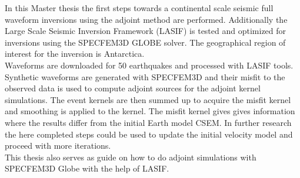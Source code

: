 
In this Master thesis the first steps towards a continental scale seismic full waveform inversions 
using the adjoint method are performed. 
Additionally the Large Scale Seismic Inversion Framework 
(LASIF) is tested and optimized for inversions using the SPECFEM3D GLOBE solver.
The geographical region of interest for the inversion is Antarctica. \\
% 
Waveforms are downloaded for 50 earthquakes and processed with LASIF tools. 
Synthetic waveforms are generated with SPECFEM3D and their misfit to the observed data is used
to compute adjoint sources for the adjoint kernel simulations. 
The event kernels are then summed up to acquire the misfit kernel and smoothing is applied to the kernel.
The misfit kernel gives gives information where the results differ from the initial Earth model CSEM.
In further research the here completed steps could be used to update the initial velocity model and 
proceed with more iterations.\\
This thesis also serves as guide on how to do adjoint simulations with SPECFEM3D Globe with the 
help of LASIF.
 




